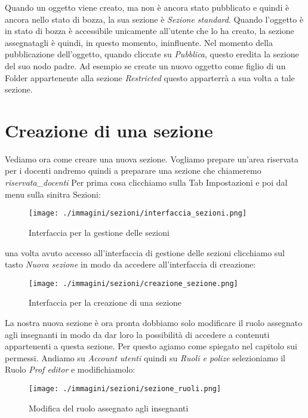 Quando un oggetto viene creato, ma non è ancora stato pubblicato e quindi è ancora nello stato di bozza, la sua sezione è \textsl{Sezione standard}. Quando l'oggetto è in stato di bozza è accessibile unicamente all'utente che lo ha creato, la sezione assegnatagli è quindi, in questo momento, ininfluente.
Nel momento della pubblicazione dell'oggetto, quando cliccate su \emph{Pubblica}, questo eredita la sezione del suo nodo padre. Ad esempio se create un nuovo oggetto come figlio di un Folder appartenente alla sezione \textsl{Restricted} questo apparterrà a sua volta a tale sezione.

\section{Creazione di una sezione}

Vediamo ora come creare una nuova sezione. Vogliamo prepare un'area riservata per i docenti andremo quindi a preparare una sezione che chiameremo \textsl{riservata\_docenti}
Per prima cosa clicchiamo sulla Tab Impostazioni e poi dal menu sulla sinitra Sezioni:

\begin{figure}[H]
 \centering
 \texttt{[image: ./immagini/sezioni/interfaccia\_sezioni.png]}
 \caption{Interfaccia per la gestione delle sezioni}
 \label{fig:sez-interfacciadocenti}
\end{figure}

una volta avuto accesso all'interfaccia di gestione delle sezioni clicchiamo sul tasto \textsl{Nuova sezione} in modo da accedere all'interfaccia di creazione:
\begin{figure}[H]
 \centering
 \texttt{[image: ./immagini/sezioni/creazione\_sezione.png]}
 \caption{Interfaccia per la creazione di una sezione}
 \label{fig:sez_interfaccia_crea}
\end{figure}
La nostra nuova sezione è ora pronta dobbiamo solo modificare il ruolo assegnato agli insegnanti in modo da dar loro la possibilità di accedere a contenuti appartenenti a questa sezione.
Per questo agiamo come spiegato nel capitolo sui permessi. Andiamo su \textsl{Account utenti} quindi su \textsl{Ruoli e polize} selezioniamo il Ruolo \textsl{Prof editor} e modifichiamolo:
\begin{figure}[H]
 \centering
 \texttt{[image: ./immagini/sezioni/sezione\_ruoli.png]}
 \caption{Modifica del ruolo assegnato agli insegnanti}
 \label{fig:sez_modifica_ruolo}
\end{figure}

